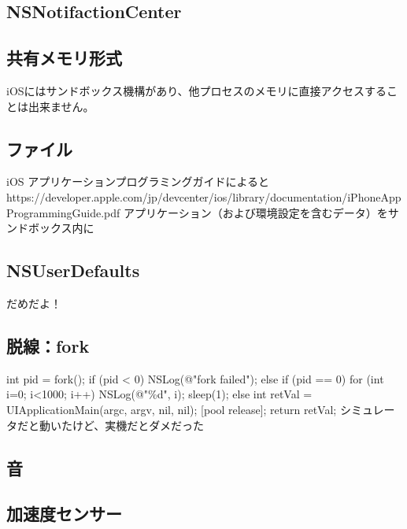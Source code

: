 \documentclass{jsarticle}
\begin{document}
\subsection{NSNotifactionCenter}

\subsection{共有メモリ形式}
iOSにはサンドボックス機構があり、他プロセスのメモリに直接アクセスすることは出来ません。

\subsection{ファイル}
iOS アプリケーションプログラミングガイドによると
https://developer.apple.com/jp/devcenter/ios/library/documentation/iPhoneAppProgrammingGuide.pdf
アプリケーション（および環境設定を含むデータ）をサンドボックス内に

\subsection{NSUserDefaults}
だめだよ！

\subsection{脱線：fork}
int pid = fork();
	if (pid < 0) {
		NSLog(@"fork failed");
	} else if (pid == 0) {
		for (int i=0; i<1000; i++) {
			NSLog(@"\%d", i);
			sleep(1);
		}
	} else {
		int retVal = UIApplicationMain(argc, argv, nil, nil);
		[pool release];
		return retVal;
	}
シミュレータだと動いたけど、実機だとダメだった

\subsection{音}

\subsection{加速度センサー}
\end{document}
